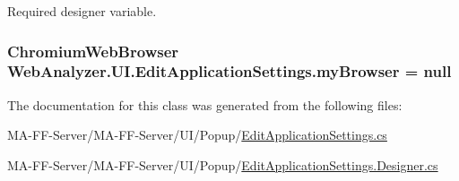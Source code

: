 Required designer variable. 

\hypertarget{class_web_analyzer_1_1_u_i_1_1_edit_application_settings_a13a4f8fb22ec5f36f5824f489231ed85}{}
\subsubsection[{my\+Browser}]{\setlength{\rightskip}{0pt plus 5cm}Chromium\+Web\+Browser Web\+Analyzer.\+U\+I.\+Edit\+Application\+Settings.\+my\+Browser = null\hspace{0.3cm}{\ttfamily [private]}}\label{class_web_analyzer_1_1_u_i_1_1_edit_application_settings_a13a4f8fb22ec5f36f5824f489231ed85}


The documentation for this class was generated from the following files\+:\begin{DoxyCompactItemize}
\item 
M\+A-\/\+F\+F-\/\+Server/\+M\+A-\/\+F\+F-\/\+Server/\+U\+I/\+Popup/\hyperlink{_edit_application_settings_8cs}{Edit\+Application\+Settings.\+cs}\item 
M\+A-\/\+F\+F-\/\+Server/\+M\+A-\/\+F\+F-\/\+Server/\+U\+I/\+Popup/\hyperlink{_edit_application_settings_8_designer_8cs}{Edit\+Application\+Settings.\+Designer.\+cs}\end{DoxyCompactItemize}
